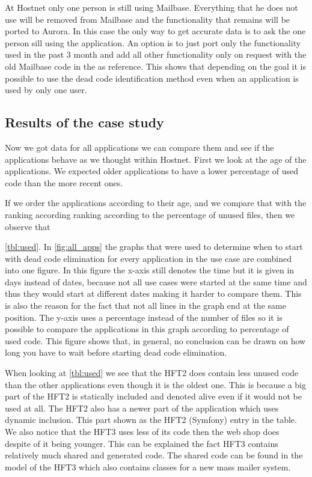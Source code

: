 At Hostnet only one person is still using Mailbase. Everything that he does not use will be removed from Mailbase and the functionality that remains will be ported to Aurora. In this case the only way to get accurate data is to ask the one person sill using the application. An option is to just port only the functionality used in the past 3 month and add all other functionality only on request with the old Mailbase code in the \vcs as reference. This shows that depending on the goal it is possible to use the dead code identification method even when an application is used by only one user.


\subsection*{Results of the case study}

Now we got data for all applications we can compare them and see if the applications behave as we thought within Hostnet. First we look at the age of the applications. We expected older applications to have a lower percentage of used code than the more recent ones. 

If we order the applications according to their age, and we compare that with the ranking according ranking according to the percentage of unused files, then we observe that

 \autoref{tbl:used}. In \autoref{fig:all_apps} the graphs that were used to determine when to start with dead code elimination for every application in the use case are combined into one figure. In this figure the x-axis still denotes the time but it is given in days instead of dates, because not all use cases were started at the same time and thus they would start at different dates making it harder to compare them. This is also the reason for the fact that not all lines in the graph end at the same position. The y-axis uses a percentage instead of the number of files so it is possible to compare the applications in this graph according to percentage of used code. This figure shows that, in general, no conclusion can be drawn on how long you have to wait before starting dead code elimination.
 
When looking at \autoref{tbl:used} we see that the HFT2 does contain less unused code than the other applications even though it is the oldest one. This is because a big part of the HFT2 is statically included and denoted alive even if it would not be used at all. The HFT2 also has a newer part of the application which uses dynamic inclusion. This part shown as the HFT2 (Symfony) entry in the table. We also notice that the HFT3 uses less of its code then the web shop does despite of it being younger. This can be explained the fact HFT3 contains relatively much shared and generated code. The shared code can be found in the model of the HFT3 which also contains classes for a new mass mailer system.
 
